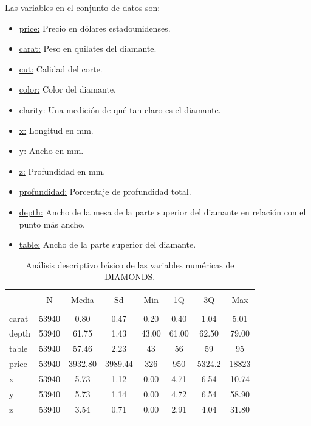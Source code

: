 \documentclass[12pt]{report} %
\theoremstyle{definition}
\begin{document}
{{Las variables en el conjunto de datos son:

\begin{itemize}
	\item \underline{price:} Precio en dólares estadounidenses.
	\item \underline{carat:} Peso en quilates del diamante.
	\item \underline{cut:} Calidad del corte.
	\item \underline{color:} Color del diamante.
	\item \underline{clarity:} Una medición de qué tan claro es el diamante.
	\item \underline{x:} Longitud en mm.
	\item \underline{y:} Ancho en mm.
	\item \underline{z:} Profundidad en mm.
	\item \underline{profundidad:} Porcentaje de profundidad total.
	\item \underline{depth:} Ancho de la mesa de la parte superior del diamante en relación con el punto más ancho.
	\item \underline{table:} Ancho de la parte superior del diamante.
\end{itemize}

\begin{table}[!htbp] \centering 
	\caption{Análisis descriptivo básico de las variables numéricas de DIAMONDS.} 
	\label{} 
	\begin{tabular}{@{\extracolsep{5pt}}lccccccc} 
		\\[-1.8ex]\hline 
		\hline \\[-1.8ex] 
		 & \multicolumn{1}{c}{N} & \multicolumn{1}{c}{Media} & \multicolumn{1}{c}{Sd} & \multicolumn{1}{c}{Min} & \multicolumn{1}{c}{1Q} & \multicolumn{1}{c}{3Q} & \multicolumn{1}{c}{Max} \\ 
		\hline \\[-1.8ex] 
		carat & 53940 & 0.80 & 0.47 & 0.20 & 0.40 & 1.04 & 5.01 \\ 
		depth & 53940 & 61.75 & 1.43 & 43.00 & 61.00 & 62.50 & 79.00 \\ 
		table & 53940 & 57.46 & 2.23 & 43 & 56 & 59 & 95 \\ 
		price & 53940 & 3932.80 & 3989.44 & 326 & 950 & 5324.2 & 18823 \\ 
		x & 53940 & 5.73 & 1.12 & 0.00 & 4.71 & 6.54 & 10.74 \\ 
		y & 53940 & 5.73 & 1.14 & 0.00 & 4.72 & 6.54 & 58.90 \\ 
		z & 53940 & 3.54 & 0.71 & 0.00 & 2.91 & 4.04 & 31.80 \\ 
		\hline \\[-1.8ex] 
	\end{tabular} 
\end{table} 

}}
\end{document}
